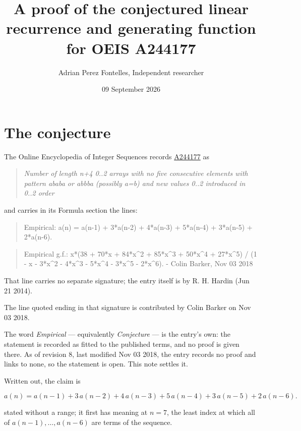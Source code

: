 \documentclass[11pt]{article}
\title{A proof of the conjectured linear recurrence and generating function for OEIS A244177}
\author{Adrian Perez Fontelles, Independent researcher}
\date{09 September 2026}
\theoremstyle{definition}
\begin{document}
\maketitle
\section{The conjecture}

The Online Encyclopedia of Integer Sequences records \href{https://oeis.org/A244177}{A244177} as

\begin{quote}\itshape Number of length n+4 0..2 arrays with no five consecutive elements with pattern ababa or abbba (possibly a=b) and new values 0..2 introduced in 0..2 order\end{quote}

and carries in its Formula section the lines:

\begin{quote}\ttfamily Empirical: a(n) = a(n-1) + 3*a(n-2) + 4*a(n-3) + 5*a(n-4) + 3*a(n-5) + 2*a(n-6).\end{quote}

\begin{quote}\ttfamily Empirical g.f.: x*(38 + 70*x + 84*x\textasciicircum{}2 + 85*x\textasciicircum{}3 + 50*x\textasciicircum{}4 + 27*x\textasciicircum{}5) / (1 - x - 3*x\textasciicircum{}2 - 4*x\textasciicircum{}3 - 5*x\textasciicircum{}4 - 3*x\textasciicircum{}5 - 2*x\textasciicircum{}6). - Colin Barker, Nov 03 2018\end{quote}

That line carries no separate signature; the entry itself is by R. H. Hardin (Jun 21 2014).

The line quoted ending in that signature is contributed by Colin Barker on Nov 03 2018.

The word {\itshape Empirical} --- equivalently {\itshape Conjecture} --- is the entry's own: the statement is recorded as fitted to the published terms, and no proof is given there. As of revision 8, last modified Nov 03 2018, the entry records no proof and links to none, so the statement is open. This note settles it.

Written out, the claim is

\[a(n) = a(n-1) + 3\,a(n-2) + 4\,a(n-3) + 5\,a(n-4) + 3\,a(n-5) + 2\,a(n-6).\]

stated without a range; it first has meaning at $n = 7$, the least index at which all of $a(n-1),\dots,a(n-6)$ are terms of the sequence.
\end{document}
